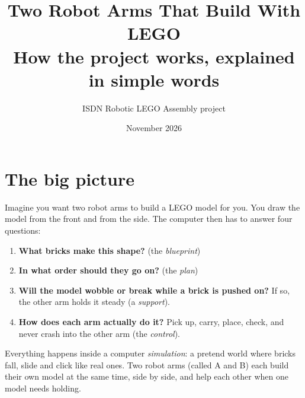 \documentclass[11pt,a4paper]{article}
\title{\textbf{Two Robot Arms That Build With LEGO}\\[4pt]
\large How the project works, explained in simple words}
\author{ISDN Robotic LEGO Assembly project}
\date{November 2026}
\begin{document}
\maketitle

\begin{center}
\end{center}

\tableofcontents
\newpage

\section{The big picture}

Imagine you want two robot arms to build a LEGO model for you. You draw the
model from the front and from the side. The computer then has to answer four
questions:

\begin{enumerate}
\item \textbf{What bricks make this shape?} (the \emph{blueprint})
\item \textbf{In what order should they go on?} (the \emph{plan})
\item \textbf{Will the model wobble or break while a brick is pushed on?} If so,
      the other arm holds it steady (a \emph{support}).
\item \textbf{How does each arm actually do it?} Pick up, carry, place, check,
      and never crash into the other arm (the \emph{control}).
\end{enumerate}

Everything happens inside a computer \emph{simulation}: a pretend world where
bricks fall, slide and click like real ones. Two robot arms (called A and B)
each build their own model at the same time, side by side, and help each other
when one model needs holding.
\end{document}
